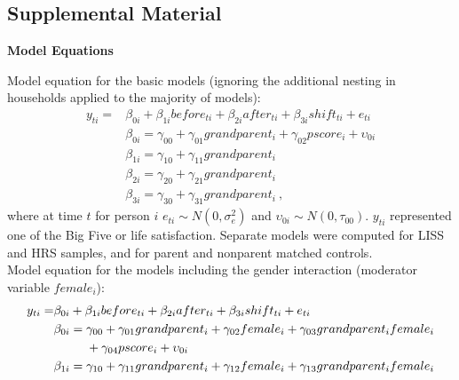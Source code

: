 \documentclass[
  english,
  man, noextraspace]{apa7}
\begin{document}
\begin{appendix}
\renewcommand{\appendixname}{\textcolor{white}{.}}

\hypertarget{supplemental-material}{%
\section{Supplemental Material}\label{supplemental-material}}

\renewcommand{\thefigure}{S\arabic{figure}} \setcounter{figure}{0}
\renewcommand{\thetable}{S\arabic{table}} \setcounter{table}{0}

\setcounter{page}{1}

\noindent \textbf{Model Equations}

Model equation for the basic models (ignoring the additional nesting in
households applied to the majority of models): \begin{equation}
\begin{split}
y_{ti} =& \beta_{0i} + \beta_{1i}before_{ti} + \beta_{2i}after_{ti} + \beta_{3i}shift_{ti} + e_{ti} \\
& \beta_{0i} = \gamma_{00} + \gamma_{01}grandparent_i + \gamma_{02}pscore_i + \upsilon_{0i} \\
& \beta_{1i} = \gamma_{10} + \gamma_{11}grandparent_i \\
& \beta_{2i} = \gamma_{20} + \gamma_{21}grandparent_i \\
& \beta_{3i} = \gamma_{30} + \gamma_{31}grandparent_i\ ,
\end{split}
\label{eq:mlm1}
\end{equation} where at time \(t\) for person \(i\)
\(e_{ti} \sim N(0, \sigma_e^2)\) and
\(\upsilon_{0i} \sim N(0, \tau_{00})\). \(y_{ti}\) represented one of
the Big Five or life satisfaction. Separate models were computed for
LISS and HRS samples, and for parent and nonparent matched controls.\\
Model equation for the models including the gender interaction
(moderator variable \(female_i\)): \begin{equation}
\begin{split}
y_{ti} =& \beta_{0i} + \beta_{1i}before_{ti} + \beta_{2i}after_{ti} + \beta_{3i}shift_{ti} + e_{ti} \\
& \beta_{0i} = \gamma_{00} + \gamma_{01}grandparent_i + \gamma_{02}female_i + \gamma_{03}grandparent_{i}female_{i} \\
& \hphantom{{}=\beta_{0i}}+ \gamma_{04}pscore_i + \upsilon_{0i} \\
& \beta_{1i} = \gamma_{10} + \gamma_{11}grandparent_i + \gamma_{12}female_i + \gamma_{13}grandparent_{i}female_{i} \\

\end{split}
\end{equation}
\end{appendix}
\end{document}
